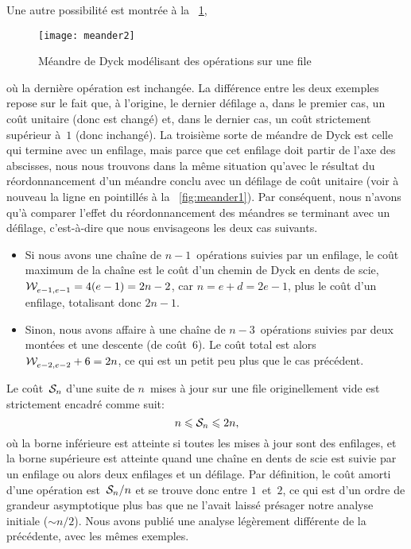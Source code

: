 Une autre possibilité est montrée à la \fig~\ref{fig:meander2},
\begin{figure}
\centering
\texttt{[image: meander2]}
\caption{Méandre de Dyck modélisant des opérations sur une file}
\label{fig:meander2}
\end{figure}
où la dernière opération est inchangée. La différence entre les deux
exemples repose sur le fait que, à l'origine, le dernier défilage a,
dans le premier cas, un coût unitaire (donc est changé) et, dans le
dernier cas, un coût strictement supérieur à~\(1\) (donc inchangé). La
troisième sorte de méandre de Dyck est celle qui termine avec un
enfilage, mais parce que cet enfilage doit partir de l'axe des
abscisses, nous nous trouvons dans la même situation qu'avec le
résultat du réordonnancement d'un méandre conclu avec un défilage de
coût unitaire (voir à nouveau la ligne en pointillés à la
\fig~\ref{fig:meander1}). Par conséquent, nous n'avons qu'à comparer
l'effet du réordonnancement des méandres se terminant avec un
défilage, c'est-à-dire que nous envisageons les deux cas suivants.
\begin{itemize}

\item Si nous avons une chaîne de \(n-1\)~opérations suivies par un
  enfilage, le coût maximum de la chaîne est le coût d'un chemin de
  Dyck en dents de scie, \(\mathcal{W}_{e-1,e-1}^{}=4(e-1)=2n-2\), car
  \(n=e+d=2e-1\), plus le coût d'un enfilage, totalisant donc
  \(2n-1\).

  \item Sinon, nous avons affaire à une chaîne de \(n-3\)~opérations
  suivies par deux montées et une descente (de coût~\(6\)). Le coût
  total est alors \(\mathcal{W}_{e-2,e-2}^{}+6=2n\), ce qui est un petit peu plus
  que le cas précédent.

\end{itemize}


Le coût~\(\mathcal{S}_{n}\) d'une suite de \(n\)~mises à jour sur une file
originellement vide est strictement encadré comme
suit:
\begin{equation*}
n \leqslant \mathcal{S}_{n} \leqslant 2n,
\end{equation*}
où la borne inférieure est atteinte si toutes les mises à jour sont
des enfilages, et la borne supérieure est atteinte quand une chaîne en
dents de scie est suivie par un enfilage ou alors deux enfilages et un
défilage. Par définition, le coût amorti d'une opération
est~\(\mathcal{S}_{n}/n\) et se trouve donc entre \(1\)~et~\(2\), ce qui est
d'un ordre de grandeur asymptotique plus bas que ne l'avait laissé
présager notre analyse initiale (\(\sim n/2\)). Nous avons publié
\citep{Rinderknecht_2011} une analyse légèrement différente de la
précédente, avec les mêmes exemples.

